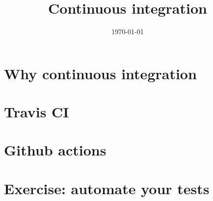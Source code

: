 \documentclass[10pt]{beamer}
\title{Continuous integration}
\date[]{\today}
\begin{document}
\begin{frame}
  \titlepage
\end{frame}


\section{Why continuous integration}


\section{Travis CI}


\section{Github actions}


\section{Exercise: automate your tests}
\end{document}

